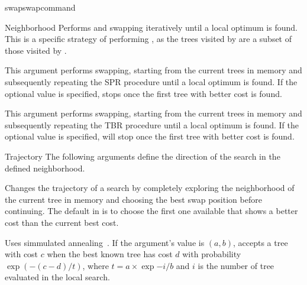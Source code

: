 \begin{command}{swap}{swapcommand}
\begin{arguments}
\begin{argumentgroup}{Neighborhood}
	            {Performs  and 
                swapping iteratively until a local optimum is found.
                This is a specific strategy of performing ,
                as the trees visited by  are a subset
                of those visited by .}
                {}

	            {This argument performs  swapping, starting
                from the current trees in memory and subsequently repeating
                the SPR procedure until  a local optimum is found. If the optional value
                 is specified,  
                stops once the first tree with better cost is found.} 
                {}

	            {This argument performs  swapping, starting
                from the current trees in memory and subsequently repeating
                the TBR procedure until  a local optimum is found.  If the optional value
                 is specified,  
                will stop once the first tree with better cost is found.}
                {}

        \end{argumentgroup}

        \begin{argumentgroup}{Trajectory}
            {The following arguments define the direction of the search in the defined
            neighborhood.}

                {Changes the trajectory of a search by
                completely exploring the neighborhood of the current
                tree in memory and choosing the best swap position
                before continuing.
                The default in \poy is to choose the first one
                available that shows a better cost than the current
                best cost.}
                {}

                {Uses simmulated annealing~\cite{Kirkpatrick1983}. If the argument's value is $(a, b)$, 
                \poy accepts a tree with cost $c$ when the best known tree has
                cost $d$ with probability $\exp{(- (c - d) / t)}$, where
                $t = a \times \exp{- i / b}$ and $i$ is the number of tree
                evaluated in the local search.}
                {}


\end{argumentgroup}
\end{arguments}
\end{command}
